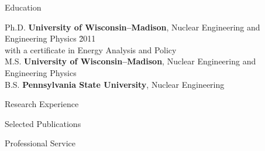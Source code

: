 \documentclass{resume3} %
\begin{document}

\begin{rSection}{Education}

\begin{tabbing}
Ph.D. \hspace*{1 em}\= \textbf{University of Wisconsin--Madison}, Nuclear Engineering and Engineering Physics \hspace*{1em} \= 2011 \\
      \> with a certificate in Energy Analysis and Policy \\
%
M.S. \hspace*{1 em}\> \textbf{University of Wisconsin--Madison}, Nuclear Engineering and Engineering Physics   \\
%
B.S. \hspace*{1 em}\> \textbf{Pennsylvania State University}, Nuclear Engineering  
\end{tabbing}
\end{rSection}

\begin{rSection}{Research Experience}

\end{rSection}

\begin{rSection}{Selected Publications}
%

\end{rSection}

\vspace*{0.5em}
\begin{rSection}{Professional Service}

\end{rSection}
\end{document}
